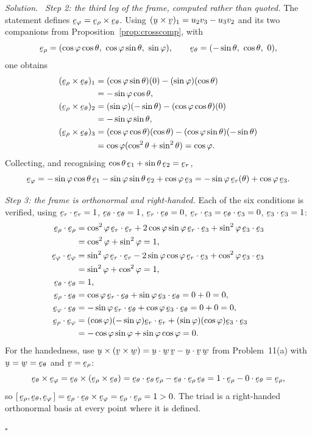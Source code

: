 \documentclass[17pt,a4paper]{extreport}
\DeclareRobustCommand{\vek}[1]{\underaccent{\tilde}{#1}}
\newcommand{\bu}{\vek{u}}
\newcommand{\bv}{\vek{v}}
\newcommand{\bw}{\vek{w}}
\newcommand{\be}{\vek{e}}
\newcommand{\ber}{\vek{e}_{r}}
\renewcommand{\beth}{\vek{e}_{\theta}}
\newcommand{\beph}{\vek{e}_{\varphi}}
\newcommand{\berho}{\vek{e}_{\rho}}
\newcommand{\tbox}[3]{[\,#1,#2,#3\,]}
\newcommand{\ip}[2]{#1\cdot#2}
\theoremstyle{scplain}
\theoremstyle{scdefn}
\theoremstyle{scplain}
\newenvironment{solution}
 {\par\smallskip\noindent\textit{Solution.}\ }
 {\hfill$\square$\par\medskip}
\begin{document}
\begin{solution}
\emph{Step 2: the third leg of the frame, computed rather than quoted.}
The statement defines $\beph=\berho\times\beth$. Using
$(\bu\times\bv)_{1}=u_{2}v_{3}-u_{3}v_{2}$ and its two companions from
Proposition~\ref{prop:crosscomp}, with
\[
   \berho=(\cos\varphi\cos\theta,\ \cos\varphi\sin\theta,\ \sin\varphi),
   \qquad
   \beth=(-\sin\theta,\ \cos\theta,\ 0),
\]
one obtains
\[
\begin{aligned}
   (\berho\times\beth)_{1}
   &=(\cos\varphi\sin\theta)(0)-(\sin\varphi)(\cos\theta)\\
   &=-\sin\varphi\cos\theta,\\
   (\berho\times\beth)_{2}
   &=(\sin\varphi)(-\sin\theta)-(\cos\varphi\cos\theta)(0)\\
   &=-\sin\varphi\sin\theta,\\
   (\berho\times\beth)_{3}
   &=(\cos\varphi\cos\theta)(\cos\theta)-(\cos\varphi\sin\theta)(-\sin\theta)\\
   &=\cos\varphi(\cos^{2}\theta+\sin^{2}\theta)=\cos\varphi .
\end{aligned}
\]
Collecting, and recognising $\cos\theta\,\be_{1}+\sin\theta\,\be_{2}=\ber$,
\[
   \beph=-\sin\varphi\cos\theta\,\be_{1}-\sin\varphi\sin\theta\,\be_{2}
         +\cos\varphi\,\be_{3}
        =-\sin\varphi\,\ber(\theta)+\cos\varphi\,\be_{3}.
\]

\emph{Step 3: the frame is orthonormal and right-handed.}
Each of the six conditions is verified, using
$\ip\ber\ber=1$, $\ip\beth\beth=1$, $\ip\ber\beth=0$,
$\ip\ber{\be_{3}}=\ip\beth{\be_{3}}=0$, $\ip{\be_{3}}{\be_{3}}=1$:
\[
\begin{aligned}
   \ip\berho\berho&=\cos^{2}\varphi\,\ip\ber\ber
     +2\cos\varphi\sin\varphi\,\ip\ber{\be_{3}}
     +\sin^{2}\varphi\,\ip{\be_{3}}{\be_{3}}\\
     &=\cos^{2}\varphi+\sin^{2}\varphi=1,\\
   \ip\beph\beph&=\sin^{2}\varphi\,\ip\ber\ber
     -2\sin\varphi\cos\varphi\,\ip\ber{\be_{3}}
     +\cos^{2}\varphi\,\ip{\be_{3}}{\be_{3}}\\
     &=\sin^{2}\varphi+\cos^{2}\varphi=1,\\
   \ip\beth\beth&=1,\\
   \ip\berho\beth&=\cos\varphi\,\ip\ber\beth
     +\sin\varphi\,\ip{\be_{3}}\beth=0+0=0,\\
   \ip\beph\beth&=-\sin\varphi\,\ip\ber\beth
     +\cos\varphi\,\ip{\be_{3}}\beth=0+0=0,\\
   \ip\berho\beph&=(\cos\varphi)(-\sin\varphi)\ip\ber\ber
     +(\sin\varphi)(\cos\varphi)\ip{\be_{3}}{\be_{3}}\\
     &=-\cos\varphi\sin\varphi+\sin\varphi\cos\varphi=0 .
\end{aligned}
\]
For the handedness, use
$\bu\times(\bv\times\bw)=\ip\bu\bw\,\bv-\ip\bu\bv\,\bw$ from
Problem~11(a) with $\bu=\bw=\beth$ and $\bv=\berho$:
\[
   \beth\times\beph=\beth\times(\berho\times\beth)
   =\ip\beth\beth\,\berho-\ip\beth\berho\,\beth
   =1\cdot\berho-0\cdot\beth=\berho,
\]
so $\tbox\berho\beth\beph=\ip\berho{\beth\times\beph}
=\ip\berho\berho=1>0$. The triad is a right-handed orthonormal basis at
every point where it is defined.


\end{solution}
\end{document}
